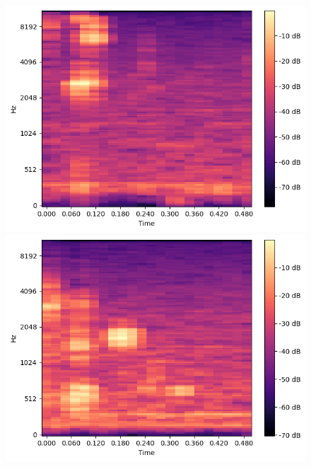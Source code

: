 \begin{figure}[t]
    \begin{minipage}[b]{0.3\hsize}
        \centering
        \includegraphics[width=\hsize]{img/melspec/rice-cookie.png}
    \end{minipage}
    \begin{minipage}[b]{0.3\hsize}
        \centering
        \includegraphics[width=\hsize]{img/melspec/potato-chips.png}
    \end{minipage}
    \begin{minipage}[b]{0.3\hsize}
        \centering

\end{minipage}
\end{figure}
